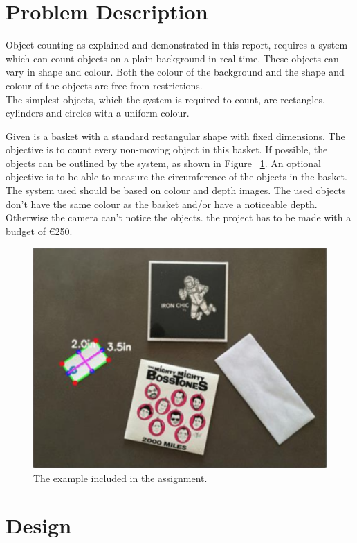 \documentclass[11pt]{article}
\begin{document}
\section{Problem Description}

\hspace{\parindent} Object counting as explained and demonstrated in this report, requires a system which can count objects on a plain background in real time. These objects can vary in shape and colour. Both the colour of the background and the shape and colour of the objects are free from restrictions.\\
The simplest objects, which the system is required to count, are rectangles, cylinders and circles with a uniform colour.

\noindent Given is a basket with a standard rectangular shape with fixed dimensions. The objective is to count every non-moving object in this basket. If possible, the objects can be outlined by the system, as shown in Figure ~\ref{fig:example}. An optional objective is to be able to measure the circumference of the objects in the basket.\\

\noindent The system used should be based on colour and depth images. The used objects don't have the same colour as the basket and/or have a noticeable depth. Otherwise the camera can't notice the objects. the project has to be made with a budget of \euro 250.\\

\begin{figure}[h!]
\centering
  \includegraphics[width=0.7\linewidth]{opdracht.png}
  \caption{The example included in the assignment.}
  \label{fig:example}
\end{figure}



\section{Design}
\end{document}
